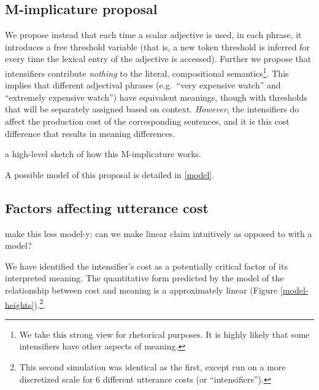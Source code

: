 \documentclass[10pt,letterpaper]{article}
\newcommand{\todo}[1]{{\color{red}#1}}
\begin{document}
\subsection{M-implicature proposal}

We propose instead that each time a scalar adjective is used, in each phrase, it introduces a free threshold variable (that is, a new token threshold is inferred for every time the lexical entry of the adjective is accessed). Further we propose that intensifiers contribute \emph{nothing} to the literal, compositional semantics\footnote{We take this strong view for rhetorical purposes. It is highly likely that some intensifiers have other aspects of meaning.}. This implies that different adjectival phrases (e.g.~``very expensive watch'' and ``extremely expensive watch'') have equivalent meanings, though with thresholds that will be separately assigned based on context. \emph{However}, the intensifiers do affect the production cost of the corresponding sentences, and it is this cost difference that results in meaning differences.

\todo{a high-level sketch of how this M-implicature works.}

A possible model of this proposal is detailed in \ref{model}.

\subsection{Factors affecting utterance cost}

\todo{make this less model-y: can we make linear claim intuitively as opposed to with a model?}

We have identified the intensifier's cost as a potentially critical factor of its interpreted meaning. The quantitative form predicted by the model of the relationship between cost and meaning is a approximately linear (Figure \ref{model-heights}).\footnote{This second simulation was identical as the first, except run on a more discretized scale for 6 different utterance costs (or ``intensifiers'').}.
\end{document}
